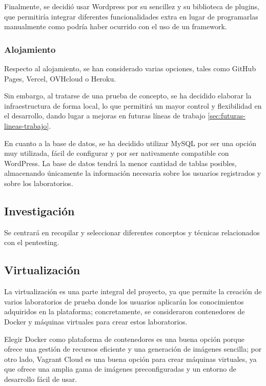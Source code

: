             Finalmente, se decidió usar Wordpress por su sencillez y su biblioteca de plugins, que permitiría integrar diferentes funcionalidades extra en lugar de programarlas manualmente como podría haber ocurrido con el uso de un framework.
                
            \subsubsection{Alojamiento}
            
                Respecto al alojamiento, se han considerado varias opciones, tales como GitHub Pages, Vercel, OVHcloud o Heroku.
                
                Sin embargo, al tratarse de una prueba de concepto, se ha decidido elaborar la infraestructura de forma local, lo que permitirá un mayor control y flexibilidad en el desarrollo, dando lugar a mejoras en futuras líneas de trabajo \ref{sec:futuras-lineas-trabajo}.

                En cuanto a la base de datos, se ha decidido utilizar MySQL por ser una opción muy utilizada, fácil de configurar y por ser nativamente compatible con WordPress. La base de datos tendrá la menor cantidad de tablas posibles, almacenando únicamente la información necesaria sobre los usuarios registrados y sobre los laboratorios.
            
        \subsection{Investigación}
        
            Se centrará en recopilar y seleccionar diferentes conceptos y técnicas relacionados con el pentesting.
        
        \subsection{Virtualización}

            La virtualización es una parte integral del proyecto, ya que permite la creación de varios laboratorios de prueba donde los usuarios aplicarán los conocimientos adquiridos en la plataforma; concretamente, se consideraron contenedores de Docker y máquinas virtuales para crear estos laboratorios.
            
            Elegir Docker como plataforma de contenedores es una buena opción porque ofrece una gestión de recursos eficiente y una generación de imágenes sencilla; por otro lado, Vagrant Cloud es una buena opción para crear máquinas virtuales, ya que ofrece una amplia gama de imágenes preconfiguradas y un entorno de desarrollo fácil de usar.
            
